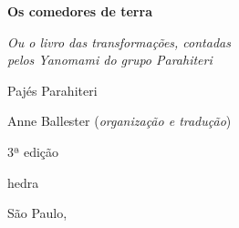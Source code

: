 




\begingroup\thispagestyle{empty}\vspace*{.05\textheight} 

            
              {\formular
              \huge
              \noindent
              \textbf{Os comedores de terra}\\
              
              \vspace{-0.5cm}
              
              }

              \vspace{0.5cm}

              \noindent{}\textit{Ou o livro das transformações, contadas\\pelos Yanomami do grupo Parahiteri}

              \vspace{1cm}
              
              {\formular\Large
              \noindent{}Pajés Parahiteri}

              \vfill              

              {\small
              \noindent{}Anne Ballester (\textit{organização e tradução})
              }

              \vspace{0.5cm}

              {\small\noindent{}3ª edição}
    \vfill

\newfontfamily{}
              \newfontfamily{}
              {\noindent\fontsize{30}{40}\selectfont\timesnewroman hedra}
              
              {\small\timesnewroman\noindent São Paulo, \the\year}

\endgroup
\pagebreak
